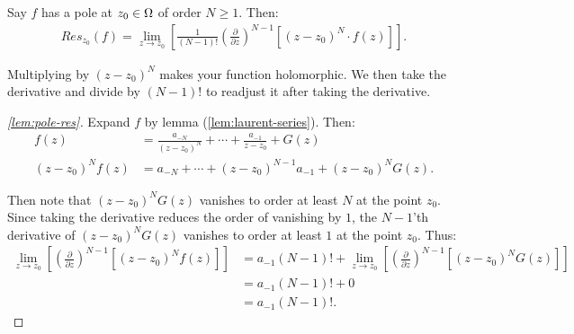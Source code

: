 \begin{lemma}\label{lem:pole-res}
Say $f$ has a pole at $z_0 \in \Omega$ of order $N \geq 1$. Then:
\begin{align*}
    Res_{z_0}(f) = \lim_{z \to z_0} \left[ \frac{1}{(N-1)!} \left( \frac{\partial}{\partial z} \right)^{N-1} \left[ (z-z_0)^N \cdot f(z) \right] \right].
\end{align*}
\end{lemma}

\begin{note}
Multiplying by $(z-z_0)^N$ makes your function holomorphic. We then take the derivative and divide by $(N-1)!$ to readjust it after taking the derivative.
\end{note}

\begin{proof}[\ref{lem:pole-res}]
Expand $f$ by lemma (\ref{lem:laurent-series}). Then:
\begin{align*}
    f(z) &= \frac{a_{-N}}{(z-z_0)^N} + \cdots + \frac{a_{-1}}{z-z_0} + G(z)\\
    (z-z_0)^N f(z) &= a_{-N} + \cdots + (z-z_0)^{N-1} a_{-1} + (z-z_0)^N G(z).
\end{align*}

Then note that $(z-z_0)^N G(z)$ vanishes to order at least $N$ at the point $z_0$. Since taking the derivative reduces the order of vanishing by $1$, the $N-1$'th derivative of $(z-z_0)^N G(z)$ vanishes to order at least $1$ at the point $z_0$. Thus:
\begin{align*}
    \lim_{z \to z_0} \left[ \left( \frac{\partial}{\partial z} \right)^{N-1} \left[ (z-z_0)^N f(z)  \right] \right] &=  a_{-1} (N-1)! + \lim_{z \to z_0} \left[ \left( \frac{\partial}{\partial z} \right)^{N-1} \left[ (z-z_0)^N G(z) \right] \right]\\
    &= a_{-1}  (N-1)! + 0\\
    &= a_{-1}  (N-1)!.
\end{align*}
\end{proof}

